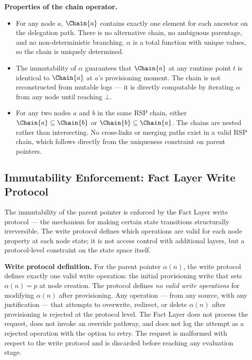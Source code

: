 \medskip
\noindent\textbf{Properties of the chain operator.}
\begin{itemize}
    \item[(C1) \textbf{Determinism}] For any node $a$, $\Chain{a}$ contains exactly one element for each ancestor on the delegation path. There is no alternative chain, no ambiguous parentage, and no non-deterministic branching. $\alpha$ is a total function with unique values, so the chain is uniquely determined.
    \item[(C2) \textbf{Stability}] The immutability of $\alpha$ guarantees that $\Chain{a}$ at any runtime point $t$ is identical to $\Chain{a}$ at $a$'s provisioning moment. The chain is not reconstructed from mutable logs --- it is directly computable by iterating $\alpha$ from any node until reaching $\bot$.
    \item[(C3) \textbf{Compositionality}] For any two nodes $a$ and $b$ in the same RSP chain, either $\Chain{a} \subseteq \Chain{b}$ or $\Chain{b} \subseteq \Chain{a}$. The chains are nested rather than intersecting. No cross-links or merging paths exist in a valid RSP chain, which follows directly from the uniqueness constraint on parent pointers.
\end{itemize}

\subsection{Immutability Enforcement: Fact Layer Write Protocol}
\label{sec:fact-layer-enforcement}

The immutability of the parent pointer is enforced by the Fact Layer write protocol --- the \bxthree{} mechanism for making certain state transitions structurally irreversible. The write protocol defines which operations are valid for each node property at each node state; it is not access control with additional layers, but a protocol-level constraint on the state space itself.

\medskip
\noindent\textbf{Write protocol definition.} For the parent pointer $\alpha(n)$, the write protocol defines exactly one valid write operation: the initial provisioning write that sets $\alpha(n) = p$ at node creation. The protocol defines \emph{no valid write operations} for modifying $\alpha(n)$ after provisioning. Any operation --- from any source, with any justification --- that attempts to overwrite, redirect, or delete $\alpha(n)$ after provisioning is rejected at the protocol level. The Fact Layer does not process the request, does not invoke an override pathway, and does not log the attempt as a rejected operation with the option to retry. The request is malformed with respect to the write protocol and is discarded before reaching any evaluation stage.

